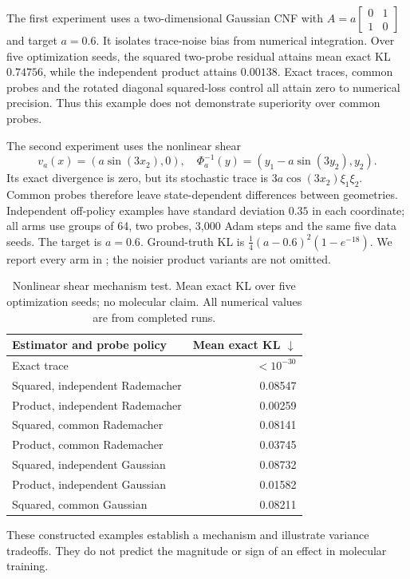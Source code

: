 The first experiment uses a two-dimensional Gaussian CNF with
$A=a\left[\begin{smallmatrix}0&1\\1&0\end{smallmatrix}\right]$ and target $a=0.6$.
It isolates trace-noise bias from numerical integration. Over five optimization seeds, the
squared two-probe residual attains mean exact KL $0.74756$, while the independent product
attains $0.00138$. Exact traces, common probes and the rotated diagonal squared-loss control
all attain zero to numerical precision. Thus this example does not demonstrate superiority
over common probes.

The second experiment uses the nonlinear shear
\[
 v_a(x)=(a\sin(3x_2),0),\quad
 \Phi_a^{-1}(y)=(y_1-a\sin(3y_2),y_2).
\]
Its exact divergence is zero, but its stochastic trace is
$3a\cos(3x_2)\xi_1\xi_2$. Common probes therefore leave state-dependent differences between
geometries. Independent off-policy examples have standard deviation $0.35$ in each coordinate;
all arms use groups of 64, two probes, 3,000 Adam steps and the same five data seeds. The target
is $a=0.6$. Ground-truth KL is
$\tfrac14(a-0.6)^2(1-e^{-18})$. We report every arm in ; the noisier product
variants are not omitted.

\begin{table}[ht]
\centering
\caption{Nonlinear shear mechanism test. Mean exact KL over five optimization seeds; no molecular
claim. All numerical values are from completed runs.}
\label{tab:sheartoy}
\begin{tabular}{lr}
\toprule
Estimator and probe policy & Mean exact KL $\downarrow$\\
\midrule
Exact trace & $<10^{-30}$\\
Squared, independent Rademacher & 0.08547\\
Product, independent Rademacher & 0.00259\\
Squared, common Rademacher & 0.08141\\
Product, common Rademacher & 0.03745\\
Squared, independent Gaussian & 0.08732\\
Product, independent Gaussian & 0.01582\\
Squared, common Gaussian & 0.08211\\
\bottomrule
\end{tabular}
\end{table}

These constructed examples establish a mechanism and illustrate variance tradeoffs. They do
not predict the magnitude or sign of an effect in molecular training.


